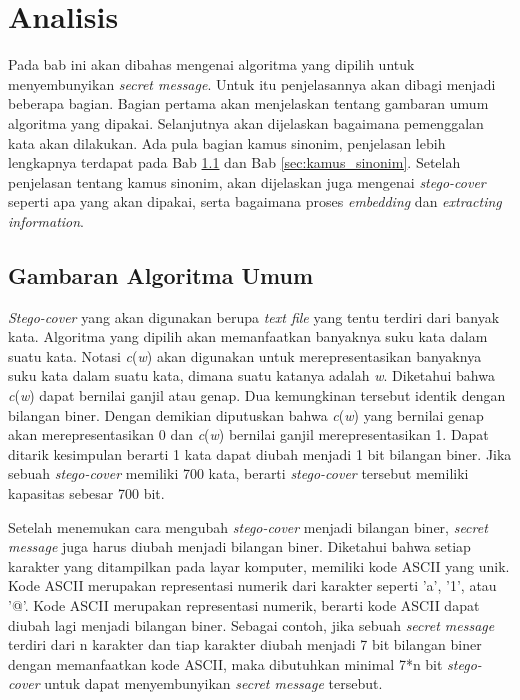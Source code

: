 \chapter{Analisis}
Pada bab ini akan dibahas mengenai algoritma yang dipilih untuk menyembunyikan \textit{secret message}. Untuk itu penjelasannya akan dibagi menjadi beberapa bagian. Bagian pertama akan menjelaskan tentang gambaran umum algoritma yang dipakai. Selanjutnya akan dijelaskan bagaimana pemenggalan kata akan dilakukan. Ada pula bagian kamus sinonim, penjelasan lebih lengkapnya terdapat pada Bab \ref{sec:gambaran_umum} dan Bab \ref{sec:kamus_sinonim}. Setelah penjelasan tentang kamus sinonim, akan dijelaskan juga mengenai \textit{stego-cover} seperti apa yang akan dipakai, serta bagaimana proses \textit{embedding} dan \textit{extracting information}.

\section{Gambaran Algoritma Umum}
\label{sec:gambaran_umum}
\textit{Stego-cover} yang akan digunakan berupa \textit{text file} yang tentu terdiri dari banyak kata. Algoritma yang dipilih akan memanfaatkan banyaknya suku kata dalam suatu kata. Notasi \textit{c}(\textit{w}) akan digunakan untuk merepresentasikan banyaknya suku kata dalam suatu kata, dimana suatu katanya adalah \textit{w}. Diketahui bahwa \textit{c}(\textit{w}) dapat bernilai ganjil atau genap. Dua kemungkinan tersebut identik dengan bilangan biner. Dengan demikian diputuskan bahwa \textit{c}(\textit{w}) yang bernilai genap akan merepresentasikan 0 dan \textit{c}(\textit{w}) bernilai ganjil merepresentasikan 1. Dapat ditarik kesimpulan berarti 1 kata dapat diubah menjadi 1 bit bilangan biner. Jika sebuah \textit{stego-cover} memiliki 700 kata, berarti \textit{stego-cover} tersebut memiliki kapasitas sebesar 700 bit.

Setelah menemukan cara mengubah \textit{stego-cover} menjadi bilangan biner, \textit{secret message} juga harus diubah menjadi bilangan biner. Diketahui bahwa setiap karakter yang ditampilkan pada layar komputer, memiliki kode ASCII yang unik. Kode ASCII merupakan representasi numerik dari karakter seperti 'a', '1', atau '@'. Kode ASCII merupakan representasi numerik, berarti kode ASCII dapat diubah lagi menjadi bilangan biner. Sebagai contoh, jika sebuah \textit{secret message} terdiri dari n karakter dan tiap karakter diubah menjadi 7 bit bilangan biner dengan memanfaatkan kode ASCII, maka dibutuhkan minimal 7*n bit \textit{stego-cover} untuk dapat menyembunyikan \textit{secret message} tersebut. 

